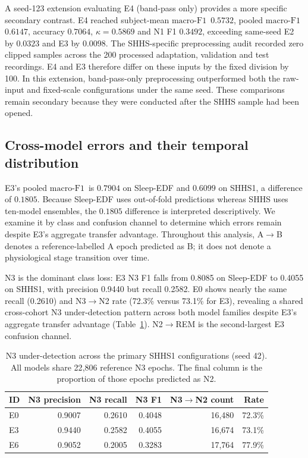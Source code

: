 \documentclass[11pt,a4paper]{article}
\newcommand{\mf}{\ensuremath{\mathrm{macro\text{-}F1}}}
\begin{document}
A seed-123 extension evaluating E4 (band-pass only) provides a more specific secondary contrast. E4
reached subject-mean \mf\ $0.5732$, pooled \mf\ $0.6147$, accuracy $0.7064$, $\kappa = 0.5869$ and N1
F1 $0.3492$, exceeding same-seed E2 by $0.0323$ and E3 by $0.0098$. The SHHS-specific preprocessing
audit recorded zero clipped samples across the 200 processed adaptation, validation and test recordings.
E4 and E3 therefore differ on these inputs by the fixed division by 100.
In this extension, band-pass-only preprocessing outperformed both the raw-input and fixed-scale
configurations under the same seed. These comparisons remain secondary
because they were conducted after the SHHS sample had been opened.

\FloatBarrier
\subsection{Cross-model errors and their temporal distribution}
\label{sec:gap}

E3's pooled \mf\ is $0.7904$ on Sleep-EDF and $0.6099$ on SHHS1, a difference of $0.1805$.
Because Sleep-EDF uses out-of-fold predictions whereas SHHS uses ten-model ensembles, the $0.1805$
difference is interpreted descriptively. We examine it by class and confusion channel to
determine which errors remain despite E3's aggregate transfer advantage. Throughout this analysis,
A$\rightarrow$B denotes a reference-labelled A epoch predicted as B; it does not denote a physiological
stage transition over time.

N3 is the dominant class loss: E3 N3 F1 falls from 0.8085 on Sleep-EDF to 0.4055 on SHHS1, with
precision 0.9440 but recall 0.2582. E0 shows nearly the same recall (0.2610) and N3$\rightarrow$N2
rate (72.3\% versus 73.1\% for E3), revealing a shared cross-cohort N3 under-detection pattern across
both model families despite E3's aggregate transfer advantage (Table~\ref{tab:cross-model-n3}).
N2$\rightarrow$REM is the second-largest E3 confusion channel.

\begin{table}[t]
\centering\small
\caption{N3 under-detection across the primary SHHS1 configurations (seed 42). All models share
22{,}806 reference N3 epochs. The final column is the proportion of those epochs predicted as N2.}
\label{tab:cross-model-n3}
\begin{tabular}{lrrrrr}
\toprule
\textbf{ID} & \textbf{N3 precision} & \textbf{N3 recall} & \textbf{N3 F1} & \textbf{N3$\to$N2 count} & \textbf{Rate} \\
\midrule
E0 & 0.9007 & 0.2610 & 0.4048 & 16{,}480 & 72.3\% \\
E3 & 0.9440 & 0.2582 & 0.4055 & 16{,}674 & 73.1\% \\
E6 & 0.9052 & 0.2005 & 0.3283 & 17{,}764 & 77.9\% \\
\bottomrule
\end{tabular}
\end{table}
\end{document}
